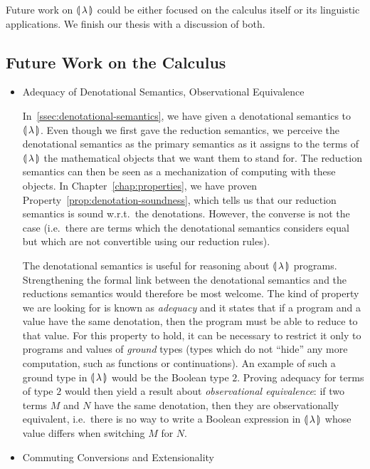 Future work on ${\llparenthesis \, \lambda \, \rrparenthesis}$ could be either focused on the calculus itself or
its linguistic applications. We finish our thesis with a discussion of
both.


\subsection{Future Work on the Calculus}
\label{ssec:future-work-calculus}

\begin{itemize}
\item Adequacy of Denotational Semantics, Observational Equivalence

  In~\ref{ssec:denotational-semantics}, we have given a denotational
  semantics to ${\llparenthesis \, \lambda \, \rrparenthesis}$. Even though we first gave the reduction semantics,
  we perceive the denotational semantics as the primary semantics as it
  assigns to the terms of ${\llparenthesis \, \lambda \, \rrparenthesis}$ the mathematical objects that we want
  them to stand for. The reduction semantics can then be seen as a
  mechanization of computing with these objects. In
  Chapter~\ref{chap:properties}, we have proven
  Property~\ref{prop:denotation-soundness}, which tells us that our
  reduction semantics is sound w.r.t.\ the denotations. However, the
  converse is not the case (i.e.\ there are terms which the denotational
  semantics considers equal but which are not convertible using our
  reduction rules).

  The denotational semantics is useful for reasoning about ${\llparenthesis \, \lambda \, \rrparenthesis}$
  programs. Strengthening the formal link between the denotational
  semantics and the reductions semantics would therefore be most
  welcome. The kind of property we are looking for is known as
  \emph{adequacy} and it states that if a program and a value have the same
  denotation, then the program must be able to reduce to that value. For
  this property to hold, it can be necessary to restrict it only to
  programs and values of \emph{ground} types (types which do not ``hide''
  any more computation, such as functions or continuations). An example of
  such a ground type in ${\llparenthesis \, \lambda \, \rrparenthesis}$ would be the Boolean type $2$. Proving
  adequacy for terms of type $2$ would then yield a result about
  \emph{observational equivalence}: if two terms $M$ and $N$ have the same
  denotation, then they are observationally equivalent, i.e.\ there is no
  way to write a Boolean expression in ${\llparenthesis \, \lambda \, \rrparenthesis}$ whose value differs when
  switching $M$ for $N$.


\item Commuting Conversions and Extensionality


\end{itemize}
